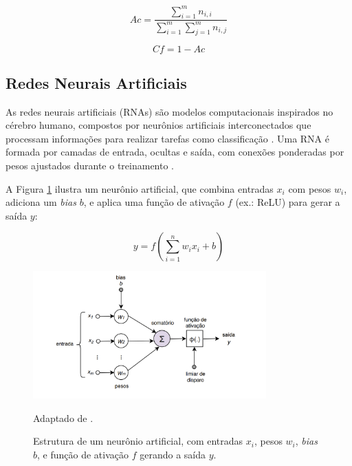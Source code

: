 \begin{equation}
Ac = \frac{\sum_{i=1}^m n_{i,i}}{\sum_{i=1}^m \sum_{j=1}^m n_{i,j}}
\label{eq:acuracia}
\end{equation}

\begin{equation}
Cf = 1 - Ac
\label{eq:erro}
\end{equation}

\subsection{Redes Neurais Artificiais}
\label{subsec:rna}

As redes neurais artificiais (RNAs) são modelos computacionais inspirados no cérebro humano, compostos por neurônios artificiais interconectados que processam informações para realizar tarefas como classificação \cite{Haykin2001}. Uma RNA é formada por camadas de entrada, ocultas e saída, com conexões ponderadas por pesos ajustados durante o treinamento \cite{RezendeTese}.

A Figura \ref{fig:neuron} ilustra um neurônio artificial, que combina entradas \(x_i\) com pesos \(w_i\), adiciona um \textit{bias} \(b\), e aplica uma função de ativação \(f\) (ex.: ReLU) para gerar a saída \(y\):

\begin{equation}
y = f\left(\sum_{i=1}^n w_i x_i + b\right)
\label{eq:neuron}
\end{equation}

\begin{figure}[h]
    \centering
    \includegraphics[width=0.8\textwidth]{figuras/NeuronioArtificial.png}
    \caption{Estrutura de um neurônio artificial, com entradas \(x_i\), pesos \(w_i\), \textit{bias} \(b\), e função de ativação \(f\) gerando a saída \(y\).} 
    Adaptado de \cite{RezendeTese}.
    \label{fig:neuron}
\end{figure}








